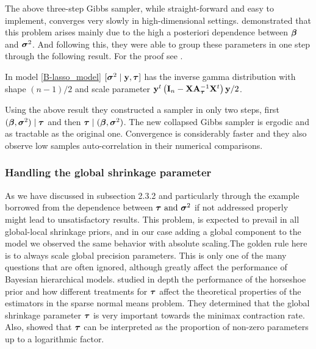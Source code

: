 \documentclass[10pt]{article}
\begin{document}
\begin{appendix}
The above three-step Gibbs sampler, while straight-forward and easy to implement, converges very slowly in high-dimensional settings. \cite{Rajaratnam2017Gibbs} demonstrated that this problem arises mainly due to the high a posteriori dependence between $\boldsymbol{\beta}$ and $\boldsymbol{\sigma}^2$. And following this, they were able to group these parameters in one step through the following result. For the proof see \cite{Rajaratnam2017Gibbs}.

\begin{lemma}\label{sigma_collapsed}
In model \eqref{B-lasso_model} $[ \boldsymbol{\sigma}^2 \mid {\bf y} ,\boldsymbol{\tau} ]$ has the inverse gamma distribution with shape $(n-1)/2$ and scale parameter ${\bf y}^{t}\left( {\bf I}_n - {\bf X}{\bf A}_{\boldsymbol{\tau}}^{-1}{\bf X}^{t} \right){\bf y} /2 $.
\end{lemma}
Using the above result they constructed a sampler in only two steps, first $(\boldsymbol{\beta} , \boldsymbol{\sigma}^2) \mid  \boldsymbol{\tau}$ and then $\boldsymbol{\tau} \mid (\boldsymbol{\beta} , \boldsymbol{\sigma}^2)$. The new collapsed Gibbs sampler is ergodic and as tractable as the original one. Convergence is considerably faster and they also observe low samples auto-correlation in their numerical comparisons.


\subsubsection{Handling the global shrinkage parameter}

As we have discussed in subsection 2.3.2 and particularly through the example borrowed from \cite{polson2010shrink} the dependence between $\boldsymbol{\tau} \text{ and } \boldsymbol{\sigma}^{2}$ if not addressed properly might lead to unsatisfactory results. This problem, is expected to prevail in all global-local shrinkage priors, and in our case adding a global component to the model we observed the same behavior with absolute scaling.The golden rule here is to always scale global precision parameters. This is only one of the many questions that are often ignored, although greatly affect the performance of Bayesian hierarchical models. \cite{van2017adaptive} studied in depth the performance of the horseshoe prior and how different treatments for $\boldsymbol{\tau}$ affect the theoretical properties of the estimators in the sparse normal means problem. They determined that the global shrinkage parameter $\boldsymbol{\tau}$ is very important towards the minimax contraction rate. Also, \cite{van2014horseshoe} showed that $\boldsymbol{\tau}$ can be interpreted as the proportion of non-zero parameters up to a logarithmic factor.


\end{appendix}
\end{document}
